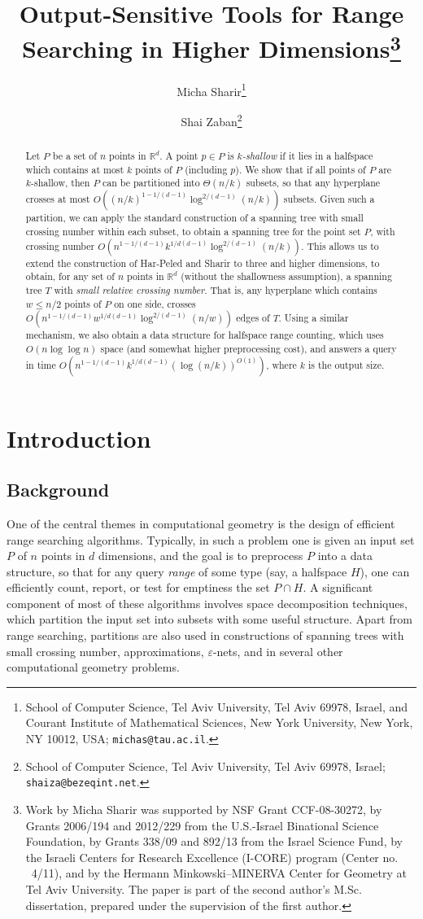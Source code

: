 \documentclass[11pt]{article}
\title{Output-Sensitive Tools for Range Searching in Higher Dimensions\thanks{Work by Micha Sharir was supported by NSF Grant CCF-08-30272, by Grants
2006/194 and 2012/229 from the U.S.-Israel Binational Science Foundation,
by Grants 338/09 and 892/13 from the Israel Science Fund, by the Israeli
Centers for Research Excellence (I-CORE) program (Center no. ~4/11), and
by the Hermann Minkowski--MINERVA Center for Geometry at Tel Aviv University.
The paper is part of the second author's M.Sc. dissertation, prepared under the supervision of the first author.
}}
\author{ Micha Sharir\thanks{School of Computer Science,
Tel Aviv University, Tel Aviv 69978, Israel, and
Courant Institute of Mathematical Sciences,
New York University, New York, NY 10012, USA;
\texttt{michas@tau.ac.il}.}
\and
Shai Zaban\thanks{School of Computer Science,
Tel Aviv University, Tel Aviv 69978, Israel;
\texttt{shaiza@bezeqint.net}.}}
\def\reals{\mathbb R}
\def\eps{\varepsilon}
\begin{document}
\maketitle

\begin{abstract}
Let $P$ be a set of $n$ points in $\reals^{d}$. A point $p \in P$ is $k$\emph{-shallow} if it lies in a halfspace which contains at most $k$ points of $P$
(including $p$). We show that if all points of $P$ are $k$-shallow, then $P$ can be partitioned into $\Theta(n/k)$ subsets, so that any hyperplane crosses
at most $O((n/k)^{1-1/(d-1)} \log^{2/(d-1)}(n/k))$ subsets. Given such a partition, we can apply the standard construction of a spanning tree with small
crossing number within each subset, to obtain a spanning tree for the point set $P$, with crossing number $O(n^{1-1/(d-1)}k^{1/d(d-1)}
\log^{2/(d-1)}(n/k))$. This allows us to extend the construction of Har-Peled and Sharir \cite{hs11} to three and higher dimensions, to obtain, for any set
of $n$ points in $\reals^{d}$ (without the shallowness assumption), a spanning tree $T$ with {\em small relative crossing number}. That is, any hyperplane
which contains $w \leq n/2$ points of $P$ on one side, crosses $O(n^{1-1/(d-1)}w^{1/d(d-1)} \log^{2/(d-1)}(n/w))$ edges of $T$. Using a similar mechanism,
we also obtain a data structure for halfspace range counting, which uses $O(n \log \log n)$ space (and somewhat higher preprocessing cost), and answers a
query in time $O(n^{1-1/(d-1)}k^{1/d(d-1)} (\log (n/k))^{O(1)})$, where $k$ is the output size.
\end{abstract}


\section{Introduction}

\subsection{Background}
One of the central themes in computational geometry is the design of efficient range searching algorithms. Typically, in such a problem one is given an
input set $P$ of $n$ points in $d$ dimensions, and the goal is to preprocess $P$ into a data structure, so that for any query {\em range} of some type (say,
a halfspace $H$), one can efficiently count, report, or test for emptiness the set $P \cap H$. A significant component of most of these algorithms involves
space decomposition techniques, which partition the input set into subsets with some useful structure. Apart from range searching, partitions are also used
in constructions of spanning trees with small crossing number, approximations, $\eps$-nets, and in several other computational geometry problems.
\end{document}

